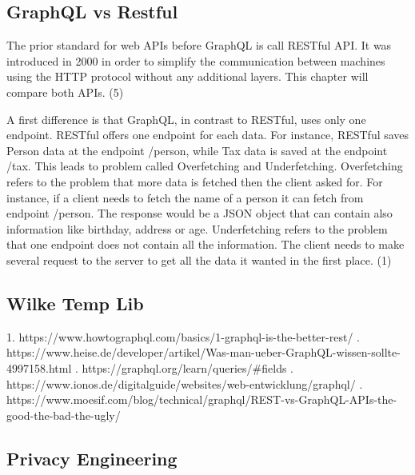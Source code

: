 \documentclass[conference]{IEEEtran}
\begin{document}
\subsection{GraphQL vs Restful}\label{graphql}

The prior standard for web APIs before GraphQL is call RESTful API. It was introduced in 2000 in order to simplify the communication between machines using the HTTP protocol without any additional layers. This chapter will compare both APIs. (5)

A first difference is that GraphQL, in contrast to RESTful, uses only one endpoint. RESTful offers one endpoint for each data. For instance, RESTful saves Person data at the endpoint /person, while Tax data is saved at the endpoint /tax. This leads to problem called Overfetching and Underfetching. Overfetching refers to the problem that more data is fetched then the client asked for. For instance, if a client needs to fetch the name of a person it can fetch from endpoint /person. The response would be a JSON object that can contain also information like birthday, address or age. Underfetching refers to the problem that one endpoint does not contain all the information. The client needs to make several request to the server to get all the data it wanted in the first place. (1)

\subsection{Wilke Temp Lib}\label{graphql}

1.	https://www.howtographql.com/basics/1-graphql-is-the-better-rest/ .	https://www.heise.de/developer/artikel/Was-man-ueber-GraphQL-wissen-sollte-4997158.html .	https://graphql.org/learn/queries/#fields .	https://www.ionos.de/digitalguide/websites/web-entwicklung/graphql/ .	https://www.moesif.com/blog/technical/graphql/REST-vs-GraphQL-APIs-the-good-the-bad-the-ugly/ \newline 


\subsection{Privacy Engineering}\label{privacy}
\end{document}
